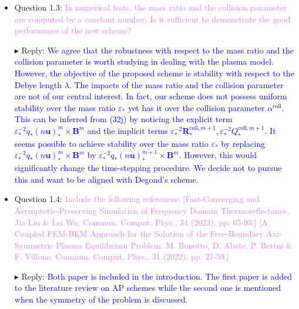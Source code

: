 \documentclass[a4paper, 10pt]{letter}
\begin{document}
\begin{itemize}
  \item Question 1.3: \textcolor{violet}{In numerical tests, the mass ratio and the collision parameter are computed by a constant number. Is it sufficient to
demonstrate the good performance of the new scheme?}
  \item[$\blacktriangleright$] Reply: \textcolor{blue}{
  We agree that the robustness with respect to the mass ratio and the collision parameter
  is worth studying in dealing with the plasma model.
  However, the objective of the proposed scheme is stability with respect to
  the Debye length $\lambda$. The impacts of the mass ratio and the collision parameter
  are not of our central interest.
  In fact, our scheme does not possess uniform stability over the mass ratio $\varepsilon_*$
  yet has it over the collision parameter $\alpha^{\text{coll}}$. This can be
  inferred from (32j) by noticing the explicit term
  $\varepsilon_*^{-2}q_*(n\mathbf{u})_*^m \times \mathbf{B}^m$
  and the implicit terms
  $\varepsilon_*^{-2}\mathbf{R}^{\text{coll}, m+1}_*, \varepsilon_*^{-2}Q^{\text{coll}, m+1}_*$.
  It seems possible to achieve stability over the mass ratio $\varepsilon_*$
  by replacing $\varepsilon_*^{-2}q_*(n\mathbf{u})_*^m \times \mathbf{B}^m$
  by $\varepsilon_*^{-2}q_*(n\mathbf{u})_*^{m+1} \times \mathbf{B}^{m}$.
  However, this would significantly change the time-stepping procedure.
  We decide not to pursue this and want to be aligned with Degond's scheme.
  }

  \item Question 1.4: \textcolor{violet}{Include the following references:
  [Fast-Converging and Asymptotic-Preserving Simulation of Frequency Domain Thermoreflectance, Jia Liu \& Lei Wu. Commun. Comput. Phys., 34 (2023), pp. 65-93.]
  [A Coupled FEM-BEM Approach for the Solution of the Free-Boundary Axi-Symmetric Plasma Equilibrium Problem. M. Bonotto, D. Abate, P. Bettni \& F. Villone. Commun. Comput. Phys., 31 (2022), pp. 27-59.]}
  \item[$\blacktriangleright$] Reply: \textcolor{blue}{Both paper is included in the introduction.
  The first paper is added to the literature review on AP schemes
  while the second one is mentioned when the symmetry of the problem is discussed.}
\end{itemize}

\newpage
\end{document}

